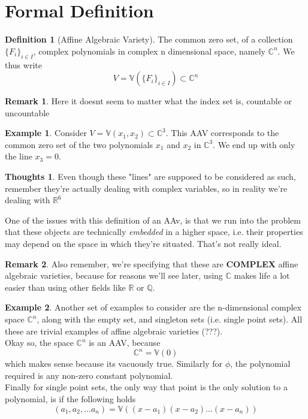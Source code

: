\documentclass[12pt]{book}
\theoremstyle{definition}
\newtheorem*{definition}{Definition}
\newtheorem{example}{Example}[chapter]
\newtheorem*{huh}{Thoughts}
\newtheorem*{remark}{Remark}
\begin{document}
\section{Formal Definition}
\begin{definition}[Affine Algebraic Variety]
The common zero set, of a collection $\{F_i\}_{i\in I}$, complex polynomials in complex n dimensional space, namely $\mathbb{C}^n$. We thus write 
$$V = \mathbb{V}(\{F_i\}_{i \in I}) \subset \mathbb{C}^n$$
\end{definition}
\begin{remark} Here it doesnt seem to matter what the index set is, countable or uncountable
\end{remark}
\begin{example}Consider $V = \mathbb{V}(x_1, x_2) \subset \mathbb{C}^3$. This AAV corresponds to the common zero set of the two polynomials $x_1$ and $x_2$ in $\mathbb{C}^3$. We end up with only the line $x_3 = 0$. 
\begin{huh}Even though these "lines" are supposed to be considered as such, remember they're actually dealing with complex variables, so in reality we're dealing with $\mathbb{R}^6$\end{huh}
\end{example}
One of the issues with this definition of an AAv, is that we run into the problem that these objects are technically \textit{embedded} in a higher space, i.e. their properties may depend on the space in which they're situated. That's not really ideal.
\begin{remark}
Also remember, we're specifying that these are \textbf{COMPLEX} affine algebraic varieties, because for reasons we'll see later, using $\mathbb{C}$ makes life a lot easier than using other fields like $\mathbb{R}$ or $\mathbb{Q}$.
\end{remark}
\begin{example}
Another set of examples to consider are the n-dimensional complex space $\mathbb{C}^n$, along with the empty set, and singleton sets (i.e. single point sets). All these are trivial examples of affine algebraic varieties (???).\\
Okay so, the space $\mathbb{C}^n$ is an AAV, because $$\mathbb{C}^n = \mathbb{V}(0)$$
which makes sense because its vacuously true. Similarly for $\phi$, the polynomial required is any non-zero constant polynomial.\\
Finally for single point sets, the only way that point is the only solution to a polynomial, is if the following holds
$$(a_1, a_2, \ldots a_n) = \mathbb{V}((x-a_1)(x-a_2)\ldots(x-a_n))$$
\end{example}
\end{document}
